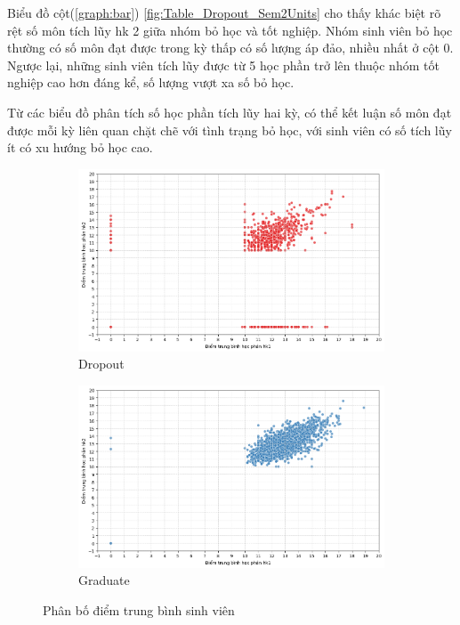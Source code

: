     \FloatBarrier

     Biểu đồ cột(\ref{graph:bar}) \ref{fig:Table_Dropout_Sem2Units} cho thấy khác biệt rõ rệt số môn tích lũy hk 2 giữa nhóm bỏ học và tốt nghiệp. Nhóm sinh viên bỏ học thường có số môn đạt được trong kỳ thấp có số lượng áp đảo, nhiều nhất ở cột 0. Ngược lại, những sinh viên tích lũy được từ 5 học phần trở lên thuộc nhóm tốt nghiệp cao hơn đáng kể, số lượng vượt xa số bỏ học. 

    Từ các biểu đồ phân tích số học phần tích lũy hai kỳ, có thể kết luận số môn đạt được mỗi kỳ liên quan chặt chẽ với tình trạng bỏ học, với sinh viên có số tích lũy ít có xu hướng bỏ học cao.

    \begin{figure}[htp]
        \centering
        \begin{subfigure}{0.45\textwidth}
            \includegraphics[width=\textwidth]{images/Table_Dropout_GradeDropout_Target.png}
            \caption{Dropout}
            \label{fig:Table_Dropout_GradeDropout_Target}
        \end{subfigure}
        \hfill
        \begin{subfigure}{0.45\textwidth}
            \includegraphics[width=\textwidth]{images/Table_Dropout_GradeGraduate_Target.png}
            \caption{Graduate}
            \label{fig:Table_Dropout_GradeGraduate_Target}
        \end{subfigure}
        \caption{Phân bố điểm trung bình sinh viên}
        \label{fig:Table_Dropout_GradeGraduate_Target}
    \end{figure}

